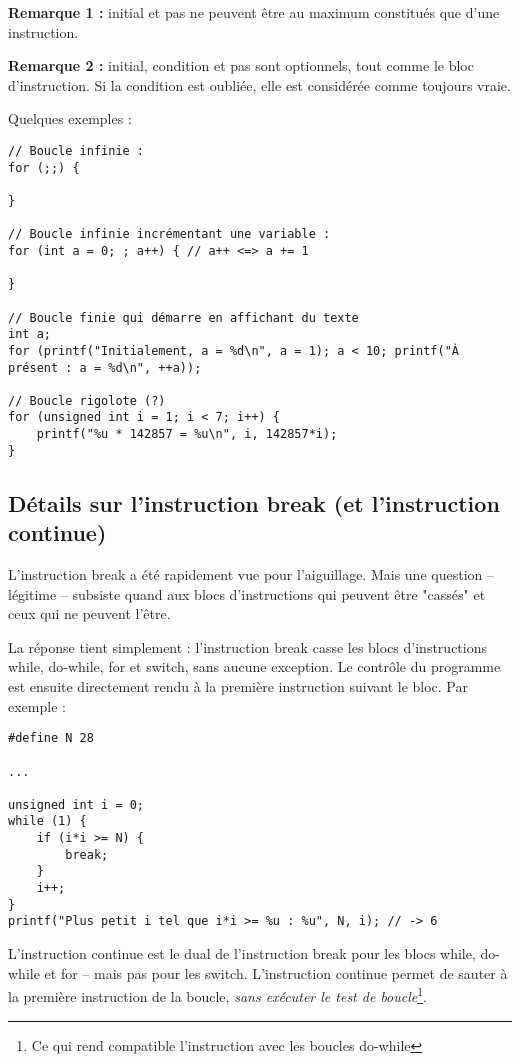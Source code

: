 \documentclass[../../../main.tex]{subfiles}
\begin{document}
\textbf{Remarque 1 :} \textsf{initial} et \textsf{pas} ne peuvent être au maximum constitués que d'une instruction.
 
\textbf{Remarque 2 :} \textsf{initial}, \textsf{condition} et \textsf{pas} sont optionnels, tout comme le bloc d'instruction. Si la condition est oubliée, elle est considérée comme toujours vraie.
 
Quelques exemples :
\begin{verbatim}
// Boucle infinie :
for (;;) {
	
}

// Boucle infinie incrémentant une variable :
for (int a = 0; ; a++) { // a++ <=> a += 1
	
}

// Boucle finie qui démarre en affichant du texte
int a;
for (printf("Initialement, a = %d\n", a = 1); a < 10; printf("À présent : a = %d\n", ++a));

// Boucle rigolote (?)
for (unsigned int i = 1; i < 7; i++) {
	printf("%u * 142857 = %u\n", i, 142857*i);
}
\end{verbatim}

\subsection{Détails sur l'instruction \textbf{break} (et l'instruction \textbf{continue})}
\label{sub:d_tails_sur_break_et_continue}
L'instruction \textsf{break} a été rapidement vue pour l'aiguillage. Mais une question -- légitime -- subsiste quand aux blocs d'instructions qui peuvent être "cassés" et ceux qui ne peuvent l'être.

La réponse tient simplement : l'instruction \textsf{break} casse les blocs d'instructions \textsf{while}, \textsf{do-while}, \textsf{for} et \textsf{switch}, sans aucune exception. Le contrôle du programme est ensuite directement rendu à la première instruction suivant le bloc. Par exemple :
\begin{verbatim}
#define N 28

...

unsigned int i = 0;
while (1) {
	if (i*i >= N) {
		break;
	}
	i++;
}
printf("Plus petit i tel que i*i >= %u : %u", N, i); // -> 6
\end{verbatim}

L'instruction \textsf{continue} est le dual de l'instruction \textsf{break} pour les blocs \textsf{while}, \textsf{do-while} et \textsf{for} -- mais pas pour les \textsf{switch}. L'instruction \textsf{continue} permet de sauter à la première instruction de la boucle, \textit{sans exécuter le test de boucle}\footnote{Ce qui rend compatible l'instruction avec les boucles \textsf{do-while}}.
\end{document}
